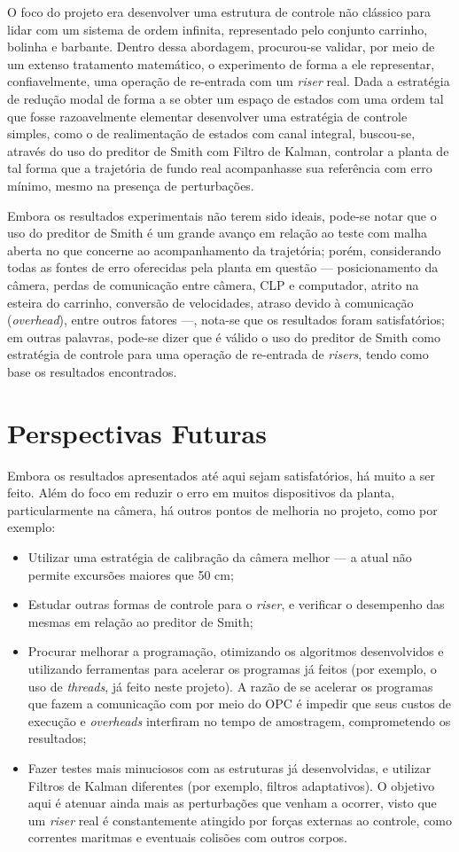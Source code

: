 O foco do projeto era desenvolver uma estrutura de controle não clássico para lidar com um sistema de ordem infinita, representado pelo conjunto carrinho, bolinha e barbante. Dentro dessa abordagem, procurou-se validar, por meio de um extenso tratamento matemático, o experimento de forma a ele representar, confiavelmente, uma operação de re-entrada com um \textit{riser} real. Dada a estratégia de redução modal de forma a se obter um espaço de estados com uma ordem tal que fosse razoavelmente elementar desenvolver uma estratégia de controle simples, como o de realimentação de estados com canal integral, buscou-se, através do uso do preditor de Smith com Filtro de Kalman, controlar a planta de tal forma que a trajetória de fundo real acompanhasse sua referência com erro mínimo, mesmo na presença de perturbações.

Embora os resultados experimentais não terem sido ideais, pode-se notar que o uso do preditor de Smith é um grande avanço em relação ao teste com malha aberta no que concerne ao acompanhamento da trajetória; porém, considerando todas as fontes de erro oferecidas pela planta em questão --- posicionamento da câmera, perdas de comunicação entre câmera, CLP e computador, atrito na esteira do carrinho, conversão de velocidades, atraso devido à comunicação (\textit{overhead}), entre outros fatores ---, nota-se que os resultados foram satisfatórios; em outras palavras, pode-se dizer que é válido o uso do preditor de Smith como estratégia de controle para uma operação de re-entrada de \textit{risers}, tendo como base os resultados encontrados.


\section{Perspectivas Futuras}
Embora os resultados apresentados até aqui sejam satisfatórios, há muito a ser feito. Além do foco em reduzir o erro em muitos dispositivos da planta, particularmente na câmera, há outros pontos de melhoria no projeto, como por exemplo:
\begin{itemize}
\item Utilizar uma estratégia de calibração da câmera melhor --- a atual não permite excursões maiores que 50 cm;
\item Estudar outras formas de controle para o \textit{riser}, e verificar o desempenho das mesmas em relação ao preditor de Smith;
\item Procurar melhorar a programação, otimizando os algoritmos desenvolvidos e utilizando ferramentas para acelerar os programas já feitos (por exemplo, o uso de \textit{threads}, já feito neste projeto). A razão de se acelerar os programas que fazem a comunicação com por meio do OPC é impedir que seus custos de execução e \textit{overheads} interfiram no tempo de amostragem, comprometendo os resultados;
\item Fazer testes mais minuciosos com as estruturas já desenvolvidas, e utilizar Filtros de Kalman diferentes (por exemplo, filtros adaptativos). O objetivo aqui é atenuar ainda mais as perturbações que venham a ocorrer, visto que um \textit{riser} real é constantemente atingido por forças externas ao controle, como correntes maritmas e eventuais colisões com outros corpos.
\end{itemize}
